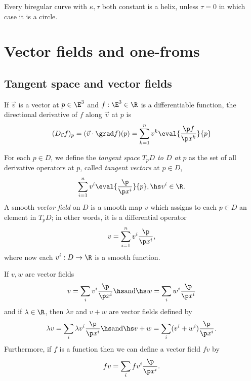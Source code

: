 \documentclass{article}
\begin{document}
\begin{corollary}
    Every biregular curve with $\kappa,\tau$ both constant is a helix, unless $\tau=0$ in
    which case it is a circle.
\end{corollary}

\section{Vector fields and one-froms}

\subsection{Tangent space and vector fields}

\begin{definition}
    If $\vec v$ is a vector at $p\in\E^3$ and $f:\E^3\in\R$ is a differentiable function,
    the directional derivative of $f$ along $\vec v$ at $p$ is
    \begin{align*}
        (D_{\vec v}f)_p = (\vec v \cdot \grad f)(p) = \sum_{k=1}^n v^k \eval{\frac{\p f}{\p x^k}}{p}
    \end{align*}
\end{definition}

\begin{definition}
    For each $p\in D$, we define the \emph{tangent space $T_pD$ to $D$ at $p$} as the
    set of all derivative operators at $p$, called \emph{tangent vectors} at $p\in D$,
    \begin{align*}
        \sum_{i=1}^n v^i \eval{\frac{\p}{\p x^i}}{p},\hs v^i\in\R.
    \end{align*}
    A smooth \emph{vector field} on $D$ is a smooth map $v$ which assigns to each $p\in D$
    an element in $T_p D$; in other words, it is a differential operator
    \begin{align*}
        v = \sum_{i=1}^n v^i \frac{\p}{\p x^i},
    \end{align*}
    where now each $v^i:D\to\R$ is a smooth function.
\end{definition}

\begin{definition}
    If $v,w$ are vector fields
    \begin{align*}
        v = \sum_i v^i \frac{\p}{\p x^i}\hs\text{and}\hs w = \sum_i w^i \frac{\p }{\p x^i}
    \end{align*}
    and if $\lambda\in\R$, then $\lambda v$ and $v+w$ are vector fields defined by
    \begin{align*}
        \lambda v = \sum_i \lambda v^i \frac{\p }{\p x^i}\hs\text{and}\hs
        v+w = \sum_i (v^i+w^i)\frac{\p }{\p x^i}.
    \end{align*}
    Furthermore, if $f$ is a function then we can define a vector field $fv$ by
    \begin{align*}
        fv = \sum_i fv^i\frac{\p }{\p x^i}.
    \end{align*}
\end{definition}
\end{document}

